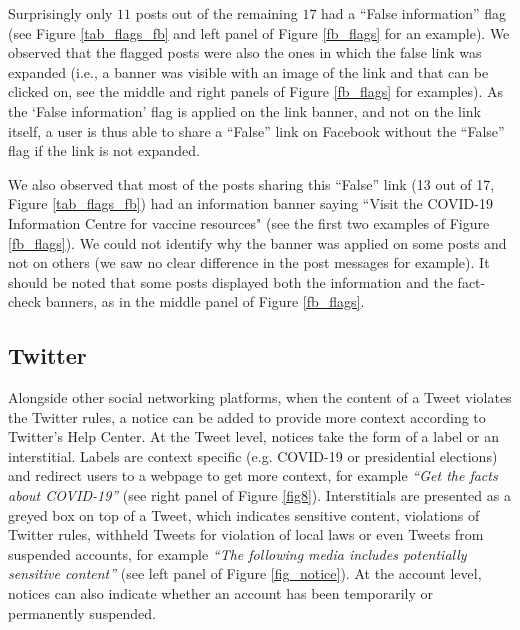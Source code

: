 \documentclass{article}
\begin{document}
\smallskip

Surprisingly only $11$ posts out of the remaining $17$ had a ``False information'' flag  (see Figure \ref{tab_flags_fb} and left panel of Figure \ref{fb_flags} for an example). We observed that the flagged posts were also the ones in which the false link was expanded (i.e., a banner was visible with an image of the link and that can be clicked on, see the middle and right panels of Figure \ref{fb_flags} for examples). As the ‘False information’ flag is applied on the link banner, and not on the link itself, a user is thus able to share a ``False'' link on Facebook without the ``False'' flag if the link is not expanded.

\smallskip

We also observed that most of the posts sharing this ``False'' link (13 out of 17, Figure \ref{tab_flags_fb}) had an information banner saying ``Visit the COVID-19 Information Centre for vaccine resources" (see the first two examples of Figure \ref{fb_flags}). We could not identify why the banner was applied on some posts and not on others (we saw no clear difference in the post messages for example). It should be noted that some posts displayed both the information and the fact-check banners, as in the middle panel of Figure \ref{fb_flags}.

\subsection{Twitter}

Alongside other social networking platforms, when the content of a Tweet violates the Twitter rules, a notice can be added to provide more context according to Twitter's Help Center. At the Tweet level, notices take the form of a label or an interstitial. Labels are context specific (e.g. COVID-19 or presidential elections) and  redirect users to a webpage to get more context, for example {\it ``Get the facts about COVID-19''} (see right panel of Figure \ref{fig8}). Interstitials are presented as a greyed box on top of a Tweet, which indicates sensitive content, violations of Twitter rules, withheld Tweets for violation of local laws or even Tweets from suspended accounts, for example {\it ``The following media includes potentially sensitive content''} (see left panel of Figure \ref{fig_notice}). At the account level, notices can also indicate whether an account has been temporarily or permanently suspended. 

\end{document}

